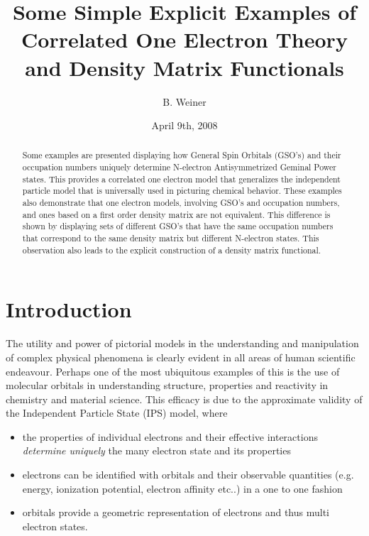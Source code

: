 \documentclass[aps,preprint]{revtex4}%
\begin{document}
\preprint{ }
\title{Some Simple Explicit Examples of Correlated One Electron Theory and Density
Matrix Functionals }
\author{B. Weiner}

\pacs{}

\begin{abstract}
Some examples are presented displaying how General Spin Orbitals (GSO's) and
their occupation numbers uniquely determine N-electron Antisymmetrized Geminal
Power states. This provides a correlated one electron model that generalizes
the independent particle model that is universally used in picturing chemical
behavior. These examples also demonstrate that one electron models, involving
GSO's and occupation numbers, and ones based on a first order density matrix
are not equivalent. This difference is shown by displaying sets of different
GSO's that have the same occupation numbers that correspond to the same
density matrix but different N-electron states. This observation also leads to
the explicit construction of a density matrix functional.

\end{abstract}
\date{April 9th, 2008}
\maketitle


\section{Introduction\label{Intro}}

The utility and power of pictorial models in the understanding and
manipulation of complex physical phenomena is clearly evident in all areas of
human scientific endeavour. Perhaps one of the most ubiquitous examples of
this is the use of molecular orbitals in understanding structure, properties
and reactivity in chemistry and material science. This efficacy is due to the
approximate validity of the Independent Particle State (IPS) model, where

\begin{itemize}
\item the properties of individual electrons and their effective interactions
\emph{determine uniquely} the many electron state and its properties

\item electrons can be identified with orbitals and their observable
quantities (e.g. energy, ionization potential, electron affinity etc..) in a
one to one fashion

\item orbitals provide a geometric representation of electrons and thus multi
electron states.
\end{itemize}
\end{document}
